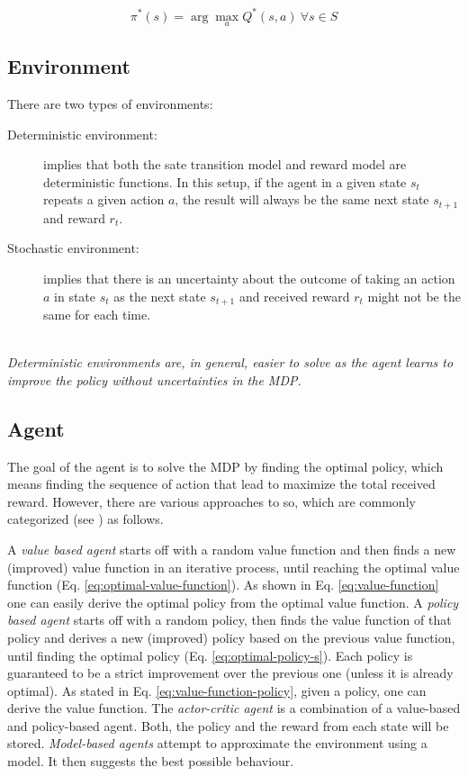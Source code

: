 \begin{equation}\label{eq:optimal-policy-s}
\pi^*(s)=\arg \max_{a} Q^*(s, a)\ \forall{s}\in{S}
\end{equation}

\subsection{Environment}
\label{sec:rl-environment}

There are two types of environments:
\begin{description}
    \item[Deterministic environment:] implies that both the sate transition model and reward model are deterministic functions. 
    In this setup, if the agent in a given state $s_t$ repeats a given action $a$, the result will always be the same next state $s_{t+1}$ and reward $r_t$.

    \item[Stochastic environment:] implies that there is an uncertainty about the outcome of taking an action $a$ in state $s_t$ as the next state $s_{t+1}$ and received reward $r_t$ might not be the same for each time.
\end{description}
\hfill
\\
\textit{Deterministic environments are, in general, easier to solve as the agent learns to improve the policy without uncertainties in the MDP. }

\subsection{Agent}
\label{sec:rl-agent}

The goal of the agent is to solve the MDP by finding the optimal policy, which means finding the sequence of action that lead to maximize the total received reward.
However, there are various approaches to so, which are commonly categorized (see \cite{rl-demysitifed2}) as follows.

A \textit{value based agent} starts off with a random value function and then finds a new (improved) value function in an iterative process, until reaching the optimal value function (Eq. \ref{eq:optimal-value-function}). 
As shown in Eq. \ref{eq:value-function} one can easily derive the optimal policy from the optimal value function. 
A \textit{policy based agent} starts off with a random policy, then finds the value function of that policy and derives a new (improved) policy based on the previous value function, until finding the optimal policy (Eq. \ref{eq:optimal-policy-s}). 
Each policy is guaranteed to be a strict improvement over the previous one (unless it is already optimal). 
As stated in Eq. \ref{eq:value-function-policy}, given a policy, one can derive the value function.
The \textit{actor-critic agent} is a combination of a value-based and policy-based agent. Both, the policy and the reward from each state will be stored.
\textit{Model-based agents} attempt to approximate the environment using a model. It then suggests the best possible behaviour.

